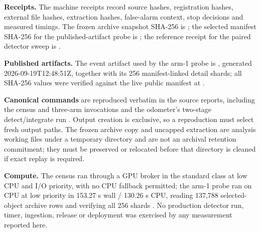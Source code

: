 \documentclass[11pt]{article}
\begin{document}

\textbf{Receipts.} The machine receipts record source hashes, registration hashes, external file hashes, extraction hashes, false-alarm context, stop decisions and measured timings. The frozen archive snapshot SHA-256 is ; the selected manifest SHA-256 for the published-artifact probe is ; the reference receipt for the paired detector sweep is %
.

\textbf{Published artifacts.} The event artifact used by the arm-1 probe is , generated 2026-09-19T12:48:51Z, together with its 256 manifest-linked detail shards; all SHA-256 values were verified against the live public manifest at %
.

\textbf{Canonical commands} are reproduced verbatim in the source reports, including the census and three-arm invocations and the odometer's two-stage detect/integrate run%
. Output creation is exclusive, so a reproduction must select fresh output paths. The frozen archive copy and uncapped extraction are analysis working files under a temporary directory and are not an archival retention commitment; they must be preserved or relocated before that directory is cleaned if exact replay is required.

\textbf{Compute.} The census ran through a GPU broker in the standard class at low CPU and I/O priority, with no CPU fallback permitted; the arm-1 probe ran on CPU at low priority in 153.27 s wall / 130.26 s CPU, reading 137,788 selected-object archive rows and verifying all 256 shards%
. No production detector run, timer, ingestion, release or deployment was exercised by any measurement reported here.
\end{document}
